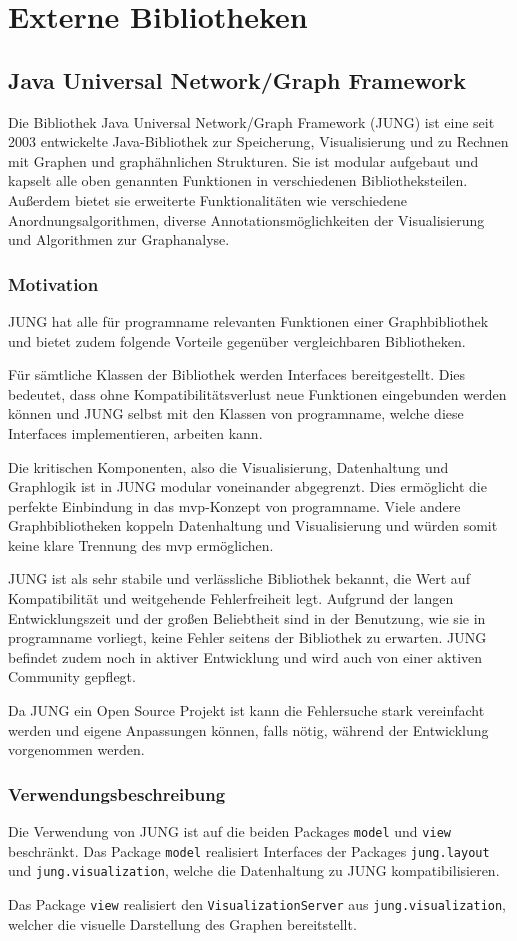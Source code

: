 \section{Externe Bibliotheken}
\subsection{Java Universal Network/Graph Framework}
Die Bibliothek Java Universal Network/Graph Framework (JUNG) ist eine seit 2003 entwickelte Java-Bibliothek zur Speicherung, Visualisierung und zu Rechnen mit Graphen und graphähnlichen Strukturen. Sie ist modular aufgebaut und kapselt alle oben genannten Funktionen in verschiedenen Bibliotheksteilen. Außerdem bietet sie erweiterte Funktionalitäten wie verschiedene Anordnungsalgorithmen, diverse Annotationsmöglichkeiten der Visualisierung und Algorithmen zur Graphanalyse.
\subsubsection{Motivation}
JUNG hat alle für \gls{programname} relevanten Funktionen einer Graphbibliothek und bietet zudem folgende Vorteile gegenüber vergleichbaren Bibliotheken.

Für sämtliche Klassen der Bibliothek werden Interfaces bereitgestellt. Dies bedeutet, dass ohne Kompatibilitätsverlust neue Funktionen eingebunden werden können und JUNG selbst mit den Klassen von \gls{programname}, welche diese Interfaces implementieren, arbeiten kann.

Die kritischen Komponenten, also die Visualisierung, Datenhaltung und Graphlogik ist in JUNG modular voneinander abgegrenzt. Dies ermöglicht die perfekte Einbindung in das \gls{mvp}-Konzept von \gls{programname}. Viele andere Graphbibliotheken koppeln Datenhaltung und Visualisierung und würden somit keine klare Trennung des \gls{mvp} ermöglichen.

JUNG ist als sehr stabile und verlässliche Bibliothek bekannt, die Wert auf Kompatibilität und weitgehende Fehlerfreiheit legt. Aufgrund der langen Entwicklungszeit und der großen Beliebtheit sind in der Benutzung, wie sie in \gls{programname} vorliegt, keine Fehler seitens der Bibliothek zu erwarten. JUNG befindet zudem noch in aktiver Entwicklung und wird auch von einer aktiven Community gepflegt.

Da JUNG ein Open Source Projekt ist kann die Fehlersuche stark vereinfacht werden und eigene Anpassungen können, falls nötig, während der Entwicklung vorgenommen werden.

\subsubsection{Verwendungsbeschreibung}

Die Verwendung von JUNG ist auf die beiden Packages \texttt{model} und  \texttt{view} beschränkt. Das Package \texttt{model} realisiert Interfaces der Packages \texttt{jung.layout} und \texttt{jung.visualization}, welche die Datenhaltung zu JUNG kompatibilisieren.

Das Package \texttt{view} realisiert den \texttt{VisualizationServer} aus \texttt{jung.visualization}, welcher die visuelle Darstellung des Graphen bereitstellt.

